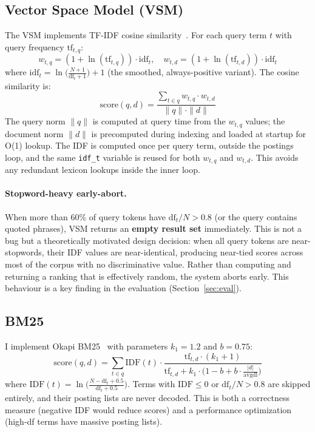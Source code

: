 \documentclass[sigconf,nonacm]{acmart}
\begin{document}
\subsection{Vector Space Model (VSM)}
The VSM implements TF-IDF cosine similarity~\cite{salton1975vsm}.  For each
query term $t$ with query frequency $\text{tf}_{t,q}$:
\begin{equation}
  w_{t,q} = (1 + \ln(\text{tf}_{t,q})) \cdot \text{idf}_t, \quad
  w_{t,d} = (1 + \ln(\text{tf}_{t,d})) \cdot \text{idf}_t
\end{equation}
where $\text{idf}_t = \ln\!\bigl(\frac{N+1}{\text{df}_t+1}\bigr) + 1$ (the
smoothed, always-positive variant).  The cosine similarity is:
\begin{equation}
  \text{score}(q, d) = \frac{\sum_{t \in q} w_{t,q} \cdot w_{t,d}}
                             {\|q\| \cdot \|d\|}
\end{equation}
The query norm $\|q\|$ is computed at query time from the $w_{t,q}$ values; the
document norm $\|d\|$ is precomputed during indexing and loaded at startup for
O(1) lookup.  The IDF is computed once per query term, outside the postings
loop, and the same \texttt{idf\_t} variable is reused for both $w_{t,q}$ and
$w_{t,d}$.  This avoids any redundant lexicon lookups inside the inner loop.

\paragraph{Stopword-heavy early-abort.}
When more than 60\% of query tokens have $\text{df}_t / N > 0.8$ (or the query
contains quoted phrases), VSM returns an \textbf{empty result set} immediately.
This is not a bug but a theoretically motivated design decision: when all query
tokens are near-stopwords, their IDF values are near-identical, producing
near-tied scores across most of the corpus with no discriminative value.  Rather
than computing and returning a ranking that is effectively random, the system
aborts early.  This behaviour is a key finding in the evaluation (Section~\ref{sec:eval}).

\subsection{BM25}
I implement Okapi BM25~\cite{robertson1994okapi,robertson2009bm25} with
parameters $k_1 = 1.2$ and $b = 0.75$:
\begin{equation}
  \text{score}(q, d) = \sum_{t \in q} \text{IDF}(t) \cdot
  \frac{\text{tf}_{t,d} \cdot (k_1 + 1)}
       {\text{tf}_{t,d} + k_1 \cdot \bigl(1 - b + b \cdot \frac{|d|}{\text{avgdl}}\bigr)}
\end{equation}
where $\text{IDF}(t) = \ln\!\bigl(\frac{N - \text{df}_t + 0.5}{\text{df}_t + 0.5}\bigr)$.
Terms with $\text{IDF} \leq 0$ or $\text{df}_t / N > 0.8$ are skipped entirely,
and their posting lists are never decoded.  This is both a correctness measure
(negative IDF would reduce scores) and a performance optimization (high-df
terms have massive posting lists).
\end{document}
